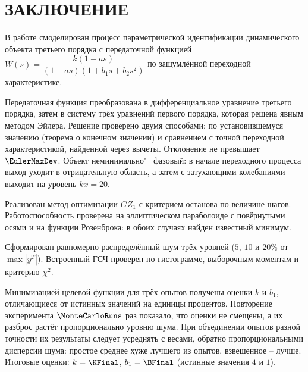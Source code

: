 \newpage
\part*{ЗАКЛЮЧЕНИЕ}
    В работе смоделирован процесс параметрической идентификации динамического объекта третьего порядка с передаточной функцией $W(s) = \dfrac{k(1-as)}{(1+as)(1+b_1s+b_2s^2)}$ по зашумлённой переходной характеристике.

    Передаточная функция преобразована в дифференциальное уравнение третьего порядка, затем в систему трёх уравнений первого порядка, которая решена явным методом Эйлера. Решение проверено двумя способами: по установившемуся значению (теорема о конечном значении) и сравнением с точной переходной характеристикой, найденной через вычеты. Отклонение не превышает $\EulerMaxDev$. Объект неминимально"=фазовый: в начале переходного процесса выход уходит в отрицательную область, а затем с затухающими колебаниями выходит на уровень $kx = 20$.

    Реализован метод оптимизации $GZ_1$ с критерием останова по величине шагов. Работоспособность проверена на эллиптическом параболоиде с повёрнутыми осями и на функции Розенброка: в обоих случаях найден известный минимум.

    Сформирован равномерно распределённый шум трёх уровней ($5$, $10$ и $20\%$ от $\max|y^T|$). Встроенный ГСЧ проверен по гистограмме, выборочным моментам и критерию $\chi^2$.

    Минимизацией целевой функции для трёх опытов получены оценки $k$ и $b_1$, отличающиеся от истинных значений на единицы процентов. Повторение эксперимента $\MonteCarloRuns$ раз показало, что оценки не смещены, а их разброс растёт пропорционально уровню шума. При объединении опытов разной точности их результаты следует усреднять с весами, обратно пропорциональными дисперсии шума: простое среднее хуже лучшего из опытов, взвешенное -- лучше. Итоговые оценки: $k = \KFinal$, $b_1 = \BFinal$ (истинные значения $4$ и $1$).
